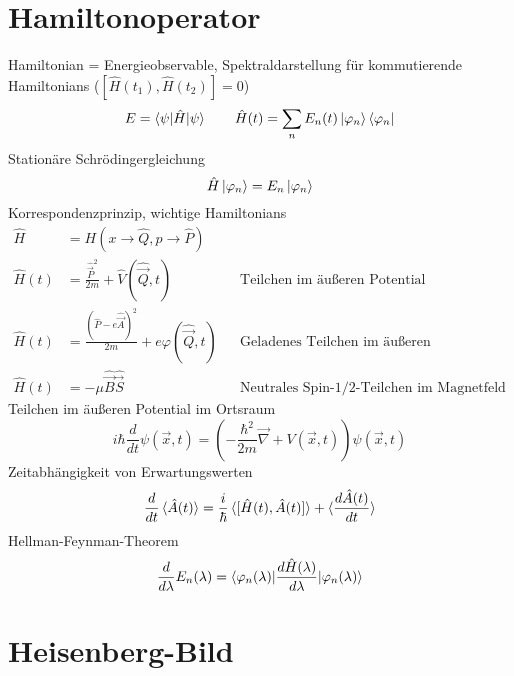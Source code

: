 \section{Hamiltonoperator}

Hamiltonian = Energieobservable, Spektraldarstellung für kommutierende Hamiltonians ($[\hat{H}(t_1), \hat{H}(t_2)]=0$) \cite[Glg. 3.6]{qm}
\begin{equation*}
	E=\braket{\psi|\hat{H}|\psi} \qquad \hat{H}(t)=\sum_n E_n(t)\ket{\varphi_n}\bra{\varphi_n}
\end{equation*}
Stationäre Schrödingergleichung \cite[3.36]{qm}
\begin{equation*}
    \hat{H}\ket{\varphi_n} = E_n\ket{\varphi_n}
\end{equation*}
Korrespondenzprinzip, wichtige Hamiltonians \cite[S. 59, Glg. 3.10-12]{qm}
\begin{align*}
	\hat{H} &= H(x\to\hat{Q},p\to\hat{P}) \\
	\hat{H}(t) &= \frac{\hat{\vec{P}}^2}{2m}+\hat{V}(\hat{\vec{Q}},t) && \text{Teilchen im äußeren Potential} \\
	\hat{H}(t) &= \frac{(\hat{P}-e\hat{\vec{A}})^2}{2m}+e\varphi(\hat{\vec{Q}},t) && \text{Geladenes Teilchen im äußeren elektromag. Feld} \\
	\hat{H}(t) &= -\mu\hat{\vec{B}}\hat{\vec{S}} && \text{Neutrales Spin-$1/2$-Teilchen im Magnetfeld}
\end{align*}
Teilchen im äußeren Potential im Ortsraum \cite[Glg. 3.31]{qm}
\begin{equation*}
	i\hbar\frac{d}{dt}\psi(\vec{x},t) = \left(-\frac{\hbar^2}{2m}\vec{\nabla} + V(\vec{x},t)\right)\psi(\vec{x},t)
\end{equation*}
Zeitabhängigkeit von Erwartungswerten \cite[Glg. 3.42]{qm}
\begin{equation*}
    \frac{d}{dt}\braket{\hat{A}(t)} = \frac{i}{\hbar} \braket{[\hat{H}(t), \hat{A}(t)]} + \braket{\frac{d\hat{A}(t)}{dt}}
\end{equation*}
Hellman-Feynman-Theorem \cite[Kap. A.12.3]{qm}
\begin{equation*}
	\frac{d}{d\lambda}E_n(\lambda) = \braket{\varphi_n(\lambda) | \frac{d\hat{H}(\lambda)}{d\lambda} | \varphi_n(\lambda)}
\end{equation*}

\section{Heisenberg-Bild}

